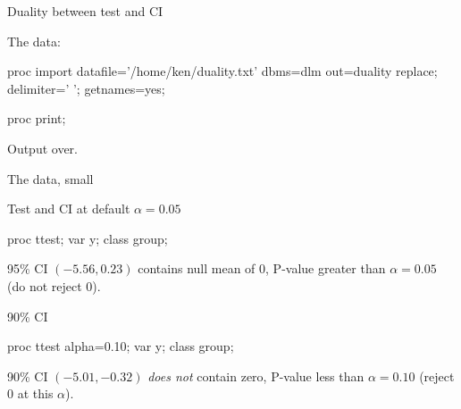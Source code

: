\documentclass[unknownkeysallowed]{beamer}\usepackage[]{graphicx}\usepackage[]{color}
\begin{document}
\begin{frame}[fragile]{Duality between test and CI}
  
    The data:
    
  \begin{Datastep}
proc import
  datafile='/home/ken/duality.txt'
    dbms=dlm
    out=duality
    replace;
  delimiter=' ';
  getnames=yes;
  \end{Datastep}
  \begin{Sascode}[store=it]
proc print;
  \end{Sascode}
  Output over.

  
\end{frame}

\begin{frame}[fragile]{The data, small}
  
  
\end{frame}

\begin{frame}[fragile]{Test and CI at default $\alpha=0.05$}
  
  \begin{Sascode}[store=iu]
    proc ttest;
      var y;
      class group;
  \end{Sascode}
  
  
  95\% CI $(-5.56,0.23)$ contains null mean of 0, P-value greater than
  $\alpha=0.05$ (do not reject 0).
  
\end{frame}

\begin{frame}[fragile]{90\% CI}
  
  \begin{Sascode}[store=iva]
    proc ttest alpha=0.10;
      var y;
      class group;
  \end{Sascode}
  
  
  90\% CI $(-5.01,-0.32)$ \emph{does not} contain zero, P-value less
  than $\alpha=0.10$ (reject 0 at this $\alpha$).
  
\end{frame}
\end{document}
